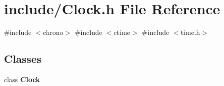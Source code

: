 \section{include/\+Clock.h File Reference}
\label{_clock_8h}
{\ttfamily \#include $<$chrono$>$}\newline
{\ttfamily \#include $<$ctime$>$}\newline
{\ttfamily \#include $<$time.\+h$>$}\newline
\subsection*{Classes}
\begin{DoxyCompactItemize}
\item 
class \textbf{ Clock}
\end{DoxyCompactItemize}
